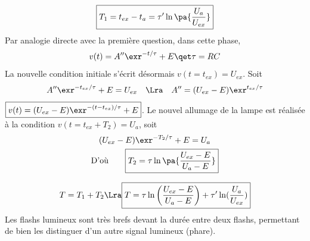 \documentclass[a4paper, 10pt, garamond, oneside]{book}
\begin{document}
{\begin{enumerate}
\[			\boxed{
			T_1 =
			t_{ex}-t_{a} =
			\tau' \ln\pa{\frac{U_{a}}{U_{ex}}}}
		\]
		 Par analogie directe avec la première question, dans cette phase,
		\[
			v(t) = A'' \exr^{-t/\tau} +E \qet \tau = RC
		\]
		\noindent
		La nouvelle condition initiale s'écrit désormais
		$v(t=t_{ex}) = U_{ex}$. Soit
		\[
			A'' \exr^{-t_{ex}/\tau} + E = U_{ex}
			\quad \Lra \quad
			A'' = (U_{ex}-E) \exr^{t_{ex}/\tau}
		\]
		{$\boxed{v(t) = (U_{ex}-E)\exr^{-(t-t_{ex})/\tau} + E}$}.
		\smallbreak
		Le nouvel allumage de la lampe est réalisée à la condition
		$v(t = t_{ex} + T_2) = U_{a}$, soit
		\begin{gather*}
			(U_{ex}-E)\exr^{-T_2/\tau} + E = U_{a}
			\\
			\text{D'où}\qquad
			\boxed{T_2 = \tau \ln\pa{\frac{U_{ex}-E}{U_{a}-E}}}
		\end{gather*}

		 \[
			T = T_1+T_2
			\Lra
			\boxed{
				T =
				\tau \ln\left(\frac{U_{ex}-E}{U_{a}-E}\right) +
				\tau' \ln(\frac{U_{a}}{U_{ex}})}
		\]
		Les flashs lumineux sont très brefs devant la durée entre deux flashs,
		permettant de bien les distinguer d'un autre signal lumineux (phare).
	\end{enumerate}
}

\newpage

\end{document}

